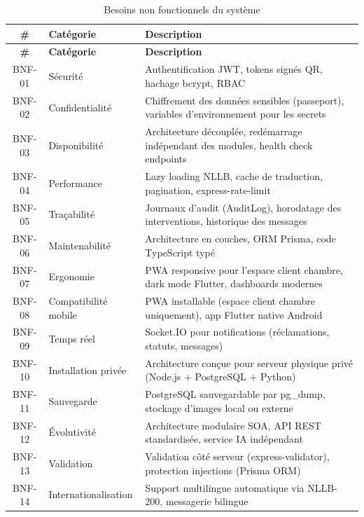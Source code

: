 
\begin{longtable}{|c|p{3cm}|p{10cm}|}
\caption{Besoins non fonctionnels du système} \label{tab:bnf} \\
\hline
\textbf{\#} & \textbf{Catégorie} & \textbf{Description} \\
\hline
\endfirsthead
\hline
\textbf{\#} & \textbf{Catégorie} & \textbf{Description} \\
\hline
\endhead
BNF-01 & Sécurité & Authentification JWT, tokens signés QR, hachage bcrypt, RBAC \\
\hline
BNF-02 & Confidentialité & Chiffrement des données sensibles (passeport), variables d'environnement pour les secrets \\
\hline
BNF-03 & Disponibilité & Architecture découplée, redémarrage indépendant des modules, health check endpoints \\
\hline
BNF-04 & Performance & Lazy loading NLLB, cache de traduction, pagination, express-rate-limit \\
\hline
BNF-05 & Traçabilité & Journaux d'audit (AuditLog), horodatage des interventions, historique des messages \\
\hline
BNF-06 & Maintenabilité & Architecture en couches, ORM Prisma, code TypeScript typé \\
\hline
BNF-07 & Ergonomie & PWA responsive pour l'espace client chambre, dark mode Flutter, dashboards modernes \\
\hline
BNF-08 & Compatibilité mobile & PWA installable (espace client chambre uniquement), app Flutter native Android \\
\hline
BNF-09 & Temps réel & Socket.IO pour notifications (réclamations, statuts, messages) \\
\hline
BNF-10 & Installation privée & Architecture conçue pour serveur physique privé (Node.js + PostgreSQL + Python) \\
\hline
BNF-11 & Sauvegarde & PostgreSQL sauvegardable par pg\_dump, stockage d'images local ou externe \\
\hline
BNF-12 & Évolutivité & Architecture modulaire SOA, API REST standardisée, service IA indépendant \\
\hline
BNF-13 & Validation & Validation côté serveur (express-validator), protection injections (Prisma ORM) \\
\hline
BNF-14 & Internationalisation & Support multilingue automatique via NLLB-200, messagerie bilingue \\
\hline
\end{longtable}
